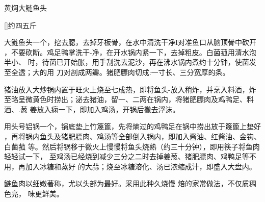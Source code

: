 \begin{recipe}{黄焖大鲢鱼头}

\ingredients

[\footnotemark]{约四五斤}

\preparation

\step 大鲢鱼头一个，挖去腮，去掉牙板骨，在水中清洗干净I对准鱼口从脑顶骨中砍开
，不要砍断。鸡足鸭掌洗干-净，在开水锅内紧一下，去掉粗皮。白菌菰用清水泡半小、
时，待菌已开始胀，用手刮洗去泥沙，再在沸水锅内煮约十分钟，使菌发至全透；大的用
刀对剖成两瓣。猪肥膘肉切成:一寸长、三分宽厚的条。

\step 猪油放入大炒锅内置于旺火上烧至七成热，即将鱼头-放入稍炸，并烹入料酒，炸
至略呈微黄色时捞出；泌去猪油，留一、二两在锅内，将猪肥膘肉及鸡鸭足、料酒、.葱
姜放入痫一下，即加入鸡汤，开锅后撇去浮沫。

\step 用头号铝锅一个，锅底垫上竹篾篦，先将熵过的鸡鸭足在锅中捞出放于篾篦上垫好
，再将锅内鱼头及猪肥膘肉、鸡汤等全部倒入锅内，即加入酱油、红酱油、金钩、白菌菰
等。然后将锅移于微火上慢慢将鱼头烧熟（约三十分钟），即用筷子将鱼肉轻轻试一下，
至鸡汤已经烧到减少三分之二时去掉姜葱、猪肥膘肉、鸡鸭足等不用，再加入冰糖和蒸好
的大蒜；烧至冰糖溶化、汤已浓缩成汁，即盛入大盘内。

\features

鲢鱼肉以细嫩著称，尤以头部为最好。采用此种久烧慢 焙的家常做法，不仅质稠色亮，
味更鲜美。


\end{recipe}

